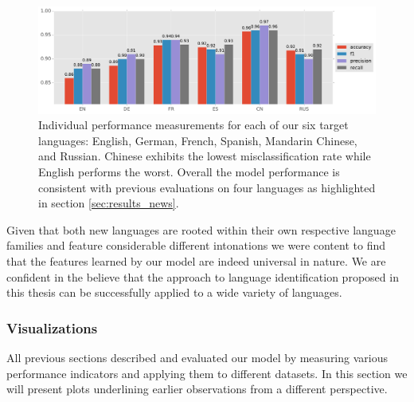 	\begin{figure}[]
  		\centering
    	\includegraphics[width=\textwidth, keepaspectratio]{plots/results_6lang_plot.pdf}
    	\caption{Individual performance measurements for each of our six target languages: English, German, French, Spanish, Mandarin Chinese, and Russian. Chinese exhibits the lowest misclassification rate while English performs the worst. Overall the model performance is consistent with previous evaluations on four languages as highlighted in section \ref{sec:results_news}.}
    	\label{fig:6lang}
	\end{figure}

Given that both new languages are rooted within their own respective language families and feature considerable different intonations we were content to find that the features learned by our model are indeed universal in nature. We are confident in the believe that the approach to language identification proposed in this thesis can be successfully applied to a wide variety of languages.

\subsubsection{Visualizations} 
\label{sec:visualization}
All previous sections described and evaluated our model by measuring various performance indicators and applying them to different datasets. In this section we will present plots underlining earlier observations from a different perspective.

